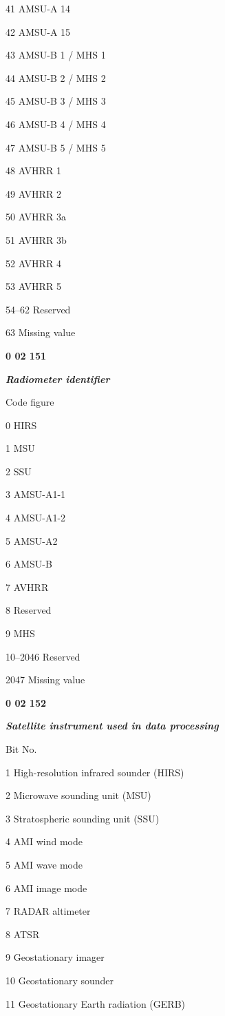 41 AMSU-A 14

42 AMSU-A 15

43 AMSU-B 1 / MHS 1

44 AMSU-B 2 / MHS 2

45 AMSU-B 3 / MHS 3

46 AMSU-B 4 / MHS 4

47 AMSU-B 5 / MHS 5

48 AVHRR 1

49 AVHRR 2

50 AVHRR 3a

51 AVHRR 3b

52 AVHRR 4

53 AVHRR 5

54--62 Reserved

63 Missing value

\textbf{0 02 151}

\emph{\textbf{Radiometer identifier}}

Code figure

0 HIRS

1 MSU

2 SSU

3 AMSU-A1-1

4 AMSU-A1-2

5 AMSU-A2

6 AMSU-B

7 AVHRR

8 Reserved

9 MHS

10--2046 Reserved

2047 Missing value\textbf{\\
}

\textbf{0 02 152}

\emph{\textbf{Satellite instrument used in data processing}}

Bit No.

1 High-resolution infrared sounder (HIRS)

2 Microwave sounding unit (MSU)

3 Stratospheric sounding unit (SSU)

4 AMI wind mode

5 AMI wave mode

6 AMI image mode

7 RADAR altimeter

8 ATSR

9 Geostationary imager

10 Geostationary sounder

11 Geostationary Earth radiation (GERB)

